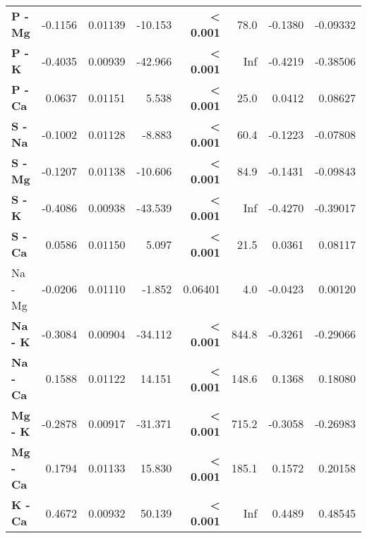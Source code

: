 \begin{table}[H]
\begin{tabular}[t]{>{}lrrr>{}rrrr}
\textbf{P - Mg} & -0.1156 & 0.01139 & -10.153 & \textbf{< 0.001} & 78.0 & -0.1380 & -0.09332\\
\textbf{P - K} & -0.4035 & 0.00939 & -42.966 & \textbf{< 0.001} & Inf & -0.4219 & -0.38506\\
\textbf{P - Ca} & 0.0637 & 0.01151 & 5.538 & \textbf{< 0.001} & 25.0 & 0.0412 & 0.08627\\
\textbf{S - Na} & -0.1002 & 0.01128 & -8.883 & \textbf{< 0.001} & 60.4 & -0.1223 & -0.07808\\
\textbf{S - Mg} & -0.1207 & 0.01138 & -10.606 & \textbf{< 0.001} & 84.9 & -0.1431 & -0.09843\\
\textbf{S - K} & -0.4086 & 0.00938 & -43.539 & \textbf{< 0.001} & Inf & -0.4270 & -0.39017\\
\textbf{S - Ca} & 0.0586 & 0.01150 & 5.097 & \textbf{< 0.001} & 21.5 & 0.0361 & 0.08117\\
Na - Mg & -0.0206 & 0.01110 & -1.852 & 0.06401 & 4.0 & -0.0423 & 0.00120\\
\textbf{Na - K} & -0.3084 & 0.00904 & -34.112 & \textbf{< 0.001} & 844.8 & -0.3261 & -0.29066\\
\textbf{Na - Ca} & 0.1588 & 0.01122 & 14.151 & \textbf{< 0.001} & 148.6 & 0.1368 & 0.18080\\
\textbf{Mg - K} & -0.2878 & 0.00917 & -31.371 & \textbf{< 0.001} & 715.2 & -0.3058 & -0.26983\\
\textbf{Mg - Ca} & 0.1794 & 0.01133 & 15.830 & \textbf{< 0.001} & 185.1 & 0.1572 & 0.20158\\
\textbf{K - Ca} & 0.4672 & 0.00932 & 50.139 & \textbf{< 0.001} & Inf & 0.4489 & 0.48545\\
\bottomrule
\end{tabular}
\end{table}
